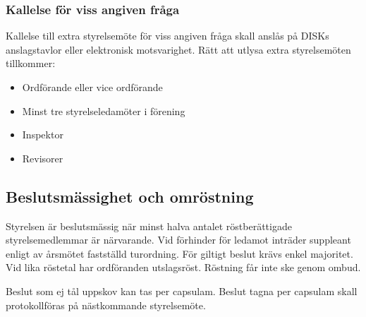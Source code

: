                 \subsubsection{Kallelse för viss angiven fråga}
                \label{subsec:kallelseforvissangivenfraga}
                        Kallelse till extra styrelsemöte för viss angiven fråga skall anslås på DISKs anslagstavlor eller elektronisk motsvarighet. Rätt att utlysa extra styrelsemöten tillkommer:
                        \begin{itemize}
                        \setlength{\itemsep}{0.0cm}
                        \setlength{\parskip}{0.0cm}
                                \item Ordförande eller vice ordförande
                                \item Minst tre styrelseledamöter i förening
                                \item Inspektor
                                \item Revisorer
                        \end{itemize}

\clearpage

        \subsection{Beslutsmässighet och omröstning}
        \label{subsec:beslutsmassighetochomrostning}
                Styrelsen är beslutsmässig när minst halva antalet röstberättigade styrelsemedlemmar är närvarande. Vid förhinder för ledamot inträder suppleant enligt av årsmötet fastställd turordning. För giltigt beslut krävs enkel majoritet. Vid lika röstetal har ordföranden utslagsröst. Röstning får inte ske genom ombud.\par
                Beslut som ej tål uppskov kan tas per capsulam. Beslut tagna per capsulam skall protokollföras på nästkommande styrelsemöte.

